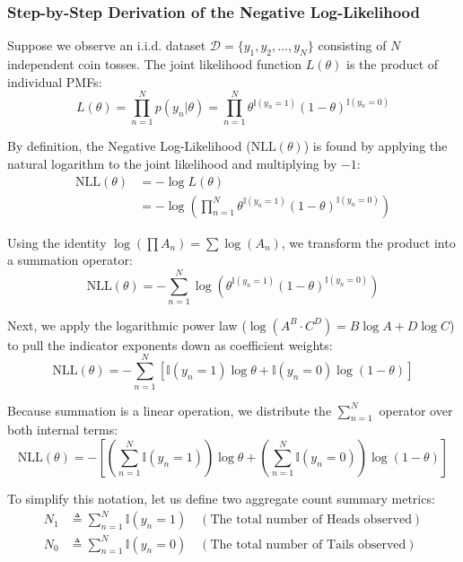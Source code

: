 \documentclass{article}
\begin{document}
\subsubsection{Step-by-Step Derivation of the Negative Log-Likelihood}

Suppose we observe an i.i.d. dataset $\mathcal{D} = \{y_1, y_2, \dots, y_N\}$ consisting of $N$ independent coin tosses. The joint likelihood function $L(\theta)$ is the product of individual PMFs:
\begin{equation}
L(\theta) = \prod_{n=1}^{N} p(y_n | \theta) = \prod_{n=1}^{N} \theta^{\mathbb{I}(y_n = 1)} (1 - \theta)^{\mathbb{I}(y_n = 0)}
\end{equation}

By definition, the Negative Log-Likelihood ($\text{NLL}(\theta)$) is found by applying the natural logarithm to the joint likelihood and multiplying by $-1$:
\begin{align*}
\text{NLL}(\theta) &= - \log L(\theta) \\
&= - \log \left( \prod_{n=1}^{N} \theta^{\mathbb{I}(y_n = 1)} (1 - \theta)^{\mathbb{I}(y_n = 0)} \right)
\end{align*}

Using the identity $\log(\prod A_n) = \sum \log(A_n)$, we transform the product into a summation operator:
\begin{equation}
\text{NLL}(\theta) = - \sum_{n=1}^{N} \log \left( \theta^{\mathbb{I}(y_n = 1)} (1 - \theta)^{\mathbb{I}(y_n = 0)} \right)
\end{equation}

Next, we apply the logarithmic power law ($\log(A^B \cdot C^D) = B\log A + D\log C$) to pull the indicator exponents down as coefficient weights:
\begin{equation}
\text{NLL}(\theta) = - \sum_{n=1}^{N} \left[ \mathbb{I}(y_n = 1) \log \theta + \mathbb{I}(y_n = 0) \log(1 - \theta) \right]
\end{equation}

Because summation is a linear operation, we distribute the $\sum_{n=1}^N$ operator over both internal terms:
\begin{equation}
\text{NLL}(\theta) = - \left[ \left( \sum_{n=1}^{N} \mathbb{I}(y_n = 1) \right) \log \theta + \left( \sum_{n=1}^{N} \mathbb{I}(y_n = 0) \right) \log(1 - \theta) \right]
\end{equation}

To simplify this notation, let us define two aggregate count summary metrics:
\begin{align}
N_1 &\triangleq \sum_{n=1}^{N} \mathbb{I}(y_n = 1) \quad (\text{The total number of Heads observed}) \\
N_0 &\triangleq \sum_{n=1}^{N} \mathbb{I}(y_n = 0) \quad (\text{The total number of Tails observed})
\end{align}
\end{document}
